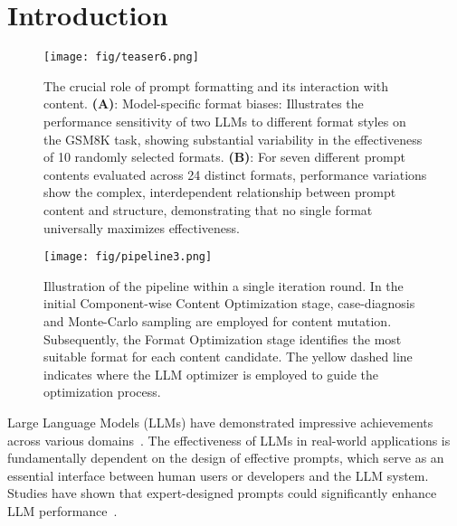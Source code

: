 \section{Introduction}

\begin{figure}[h]
    \vspace{-2ex}
    \texttt{[image: fig/teaser6.png]}
    \vspace{-3.5ex}
    \caption{
    The crucial role of prompt formatting and its interaction with content. \textbf{(A)}: Model-specific format biases: Illustrates the performance sensitivity of two LLMs to different format styles on the GSM8K task, showing substantial variability in the effectiveness of 10 randomly selected formats. \textbf{(B)}: For seven different prompt contents evaluated across 24 distinct formats, performance variations show the complex, interdependent relationship between prompt content and structure, demonstrating that no single format universally maximizes effectiveness.}
    \vspace{-3ex}
\label{fig:teaser}
\end{figure}

\begin{figure*}[t]
  \vspace{-2ex}
  \texttt{[image: fig/pipeline3.png]}
  \vspace{-3ex}
  \caption {Illustration of the \sysname{} pipeline within a single iteration round. In the initial Component-wise Content Optimization stage, case-diagnosis and Monte-Carlo sampling are employed for content mutation. Subsequently, the Format Optimization stage identifies the most suitable format for each content candidate. The yellow dashed line indicates where the LLM optimizer is employed to guide the optimization process.}
  \label{fig:pipeline}
  \vspace{-2ex}
\end{figure*}

Large Language Models (LLMs) have demonstrated impressive achievements across various domains~\cite{openai2024gpt4technicalreport}. The effectiveness of LLMs in real-world applications is fundamentally dependent on the design of effective prompts, which serve as an essential interface between human users or developers and the LLM system. Studies have shown that expert-designed prompts could significantly enhance LLM performance~\citep{brown2020incontextlearning, wei2023chainofthought,A_2024_prompt_survey}.

